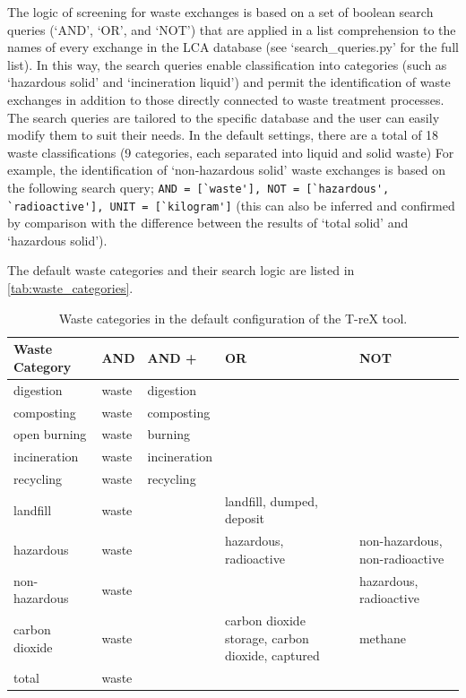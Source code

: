 \documentclass{article}
\renewcommand{\texttt}[1]{{\ttfamily\small\nolinkurl{#1}}}
\begin{document}
The logic of screening for waste exchanges is based on a set of boolean search queries (`AND', `OR', and `NOT') that are applied in a list comprehension to the names of every exchange in the LCA database (see `search\_queries.py' for the full list). In this way, the search queries enable classification into categories (such as `hazardous solid' and `incineration liquid') and permit the identification of waste exchanges in addition to those directly connected to waste treatment processes. The search queries are tailored to the specific database and the user can easily modify them to suit their needs. In the default settings, there are a total of 18 waste classifications (9 categories, each separated into liquid and solid waste) For example, the identification of `non-hazardous solid' waste exchanges is based on the following search query; \texttt{AND = [`waste'], NOT = [`hazardous', `radioactive'], UNIT = [`kilogram']} (this can also be inferred and confirmed by comparison with the difference between the results of `total solid' and `hazardous solid').

The default waste categories and their search logic are listed in \autoref{tab:waste_categories}. 

\begin{table}[ht]
    \centering
    \caption{Waste categories in the default configuration of the T-reX tool.}\label{tab:waste_categories}
    \begin{tabularx}{\textwidth}{p{2.5cm}p{1cm}p{1.5cm}XX}
    \toprule
    \textbf{Waste Category} & \textbf{AND} & \textbf{AND +} & \textbf{OR} & \textbf{NOT} \\
    \midrule
    digestion & waste & digestion & & \\
    composting & waste & composting & & \\
    open burning & waste & burning & & \\
    incineration & waste & incineration & & \\
    recycling & waste & recycling & & \\
    landfill & waste & & landfill, dumped, deposit & \\
    hazardous & waste & & hazardous, radioactive & non-hazardous, non-radioactive \\
    non-hazardous & waste & & & hazardous, radioactive \\
    carbon dioxide & waste & & carbon dioxide storage, carbon dioxide, captured & methane \\
    total & waste & & & \\
    \bottomrule
    \end{tabularx}
\end{table}
\end{document}
